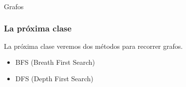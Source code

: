 \documentclass{beamer}
\begin{document}
\begin{section}{Grafos}
	\begin{frame}
		\frametitle{La próxima clase}
		La próxima clase veremos dos métodos para recorrer grafos.
		\begin{itemize}
			\item {BFS (Breath First Search)}
			\item {DFS (Depth First Search)}
		\end{itemize}
	\end{frame}
	
	
\end{section}
\end{document}
